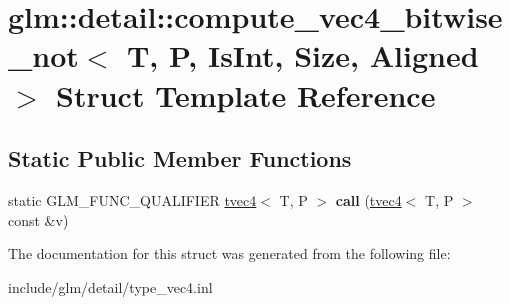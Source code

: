 \hypertarget{structglm_1_1detail_1_1compute__vec4__bitwise__not}{}\section{glm\+:\+:detail\+:\+:compute\+\_\+vec4\+\_\+bitwise\+\_\+not$<$ T, P, Is\+Int, Size, Aligned $>$ Struct Template Reference}
\label{structglm_1_1detail_1_1compute__vec4__bitwise__not}
\subsection*{Static Public Member Functions}
\begin{DoxyCompactItemize}
\item 
\mbox{\label{structglm_1_1detail_1_1compute__vec4__bitwise__not_a75003ee4847f65f163002b6f4baf1b61}} 
static G\+L\+M\+\_\+\+F\+U\+N\+C\+\_\+\+Q\+U\+A\+L\+I\+F\+I\+ER \hyperlink{structglm_1_1tvec4}{tvec4}$<$ T, P $>$ {\bfseries call} (\hyperlink{structglm_1_1tvec4}{tvec4}$<$ T, P $>$ const \&v)
\end{DoxyCompactItemize}


The documentation for this struct was generated from the following file\+:\begin{DoxyCompactItemize}
\item 
include/glm/detail/type\+\_\+vec4.\+inl\end{DoxyCompactItemize}
